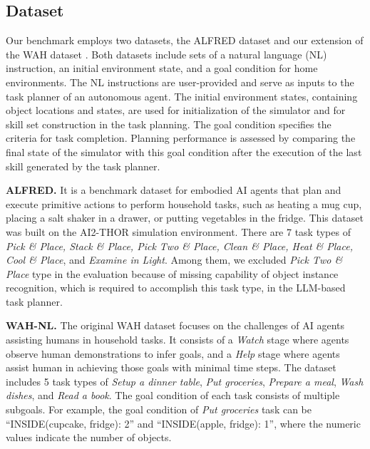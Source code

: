 \subsection{Dataset}
\label{subsec:dataset}
Our benchmark employs two datasets, the ALFRED dataset \citep{shridhar2020alfred} and our extension of the WAH dataset \citep{puig2021watchandhelp}. Both datasets include sets of a natural language (NL) instruction, an initial environment state, and a goal condition for home environments. The NL instructions are user-provided and serve as inputs to the task planner of an autonomous agent. The initial environment states, containing object locations and states, are used for initialization of the simulator and for skill set construction in the task planning. The goal condition specifies the criteria for task completion. Planning performance is assessed by comparing the final state of the simulator with this goal condition after the execution of the last skill generated by the task planner.

\textbf{ALFRED.} It is a benchmark dataset for embodied AI agents that plan and execute primitive actions to perform household tasks, such as heating a mug cup, placing a salt shaker in a drawer, or putting vegetables in the fridge. This dataset was built on the AI2-THOR simulation environment. There are 7 task types of \textit{Pick \& Place, Stack \& Place, Pick Two \& Place, Clean \& Place, Heat \& Place, Cool \& Place}, and \textit{Examine in Light}. Among them, we excluded \textit{Pick Two \& Place} type in the evaluation because of missing capability of object instance recognition, which is required to accomplish this task type, in the LLM-based task planner.

\textbf{WAH-NL.} The original WAH dataset focuses on the challenges of AI agents assisting humans in household tasks. It consists of a \textit{Watch} stage where agents observe human demonstrations to infer goals, and a \textit{Help} stage where agents assist human in achieving those goals with minimal time steps. The dataset includes 5 task types of \textit{Setup a dinner table}, \textit{Put groceries}, \textit{Prepare a meal}, \textit{Wash dishes}, and \textit{Read a book}. The goal condition of each task consists of multiple subgoals. For example, the goal condition of \textit{Put groceries} task can be “INSIDE(cupcake, fridge): 2” and “INSIDE(apple, fridge): 1”, where the numeric values indicate the number of objects.

